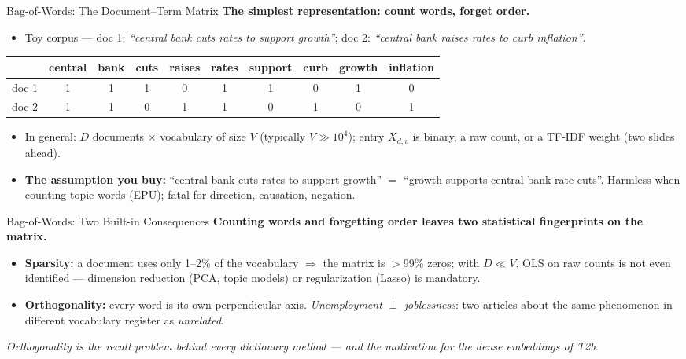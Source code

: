 \begin{frame}{Bag-of-Words: The Document--Term Matrix}
\textbf{The simplest representation: count words, forget order.}
\begin{itemize}
\item Toy corpus --- doc 1: \emph{``central bank cuts rates to support growth''}; doc 2: \emph{``central bank raises rates to curb inflation''}.
\end{itemize}
\begin{center}
\footnotesize
\begin{tabular}{l c c c c c c c c c}
\toprule
 & central & bank & cuts & raises & rates & support & curb & growth & inflation \\
\midrule
doc 1 & 1 & 1 & 1 & 0 & 1 & 1 & 0 & 1 & 0 \\
doc 2 & 1 & 1 & 0 & 1 & 1 & 0 & 1 & 0 & 1 \\
\bottomrule
\end{tabular}
\end{center}
\begin{itemize}
\item In general: $D$ documents $\times$ vocabulary of size $V$ (typically $V \gg 10^4$); entry $X_{d,v}$ is binary, a raw count, or a TF-IDF weight (two slides ahead).
\item \textbf{The assumption you buy:} ``central bank cuts rates to support growth'' $=$ ``growth supports central bank rate cuts''. Harmless when counting topic words (EPU); fatal for direction, causation, negation.
\end{itemize}
\end{frame}

\begin{frame}{Bag-of-Words: Two Built-in Consequences}
\textbf{Counting words and forgetting order leaves two statistical fingerprints on the matrix.}
\begin{itemize}
\item \textbf{Sparsity:} a document uses only 1--2\% of the vocabulary $\Rightarrow$ the matrix is $>$99\% zeros; with $D \ll V$, OLS on raw counts is not even identified --- dimension reduction (PCA, topic models) or regularization (Lasso) is mandatory.
\item \textbf{Orthogonality:} every word is its own perpendicular axis. \emph{Unemployment} $\perp$ \emph{joblessness}: two articles about the same phenomenon in different vocabulary register as \emph{unrelated}.
\end{itemize}
\medskip
\textit{\footnotesize Orthogonality is the recall problem behind every dictionary method --- and the motivation for the dense embeddings of T2b.}
\end{frame}

